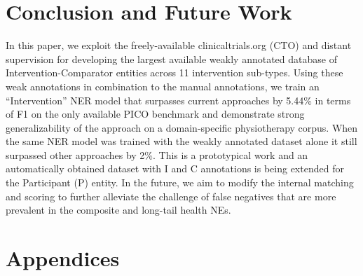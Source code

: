 \documentclass[letterpaper]{article} %
\begin{document}
\section{Conclusion and Future Work}
\label{sec:conclusion}
%
In this paper, we exploit the freely-available clinicaltrials.org (CTO) and distant supervision for developing the largest available weakly annotated database of Intervention-Comparator entities across 11 intervention sub-types.
Using these weak annotations in combination to the manual annotations, we train an ``Intervention'' NER model that surpasses current approaches  by 5.44\% in terms of F1 on the only available PICO benchmark and demonstrate strong generalizability of the approach on a domain-specific physiotherapy corpus.
When the same NER model was trained with the weakly annotated dataset alone it still surpassed other approaches by 2\%.
This is a prototypical work and an automatically obtained dataset with I and C annotations is being extended for the Participant (P) entity.
In the future, we aim to modify the internal matching and scoring to further alleviate the challenge of false negatives that are more prevalent in the composite and long-tail health NEs.
%
%
%
%
\bigskip

\clearpage
\appendix
\section{Appendices}
\label{appendix}
%
\end{document}
